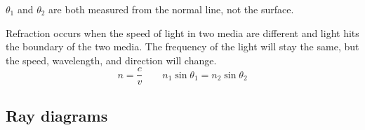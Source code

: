 $\theta_1$ and $\theta_2$ are both measured from the normal line, not the surface.

Refraction occurs when the speed of light in two media are different and light hits the boundary of the two media. The frequency of the light will stay the same, but the speed, wavelength, and direction will change.
\[
	n = \frac{c}{v} \qquad n_1 \sin \theta_1 = n_2 \sin \theta_2
\]

\subsection{Ray diagrams}


